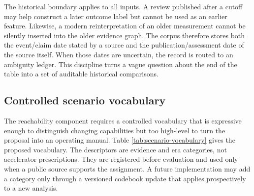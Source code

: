 \documentclass[conference]{IEEEtran}
\begin{document}
The historical boundary applies to all inputs. A review published after a cutoff may help construct a later outcome label but cannot be used as an earlier feature. Likewise, a modern reinterpretation of an older measurement cannot be silently inserted into the older evidence graph. The corpus therefore stores both the event/claim date stated by a source and the publication/assessment date of the source itself. When those dates are uncertain, the record is routed to an ambiguity ledger. This discipline turns a vague question about the end of the table into a set of auditable historical comparisons.

\subsection{Controlled scenario vocabulary}

The reachability component requires a controlled vocabulary that is expressive enough to distinguish changing capabilities but too high-level to turn the proposal into an operating manual. Table \ref{tab:scenario-vocabulary} gives the proposed vocabulary. The descriptors are evidence and era categories, not accelerator prescriptions. They are registered before evaluation and used only when a public source supports the assignment. A future implementation may add a category only through a versioned codebook update that applies prospectively to a new analysis.
\end{document}
